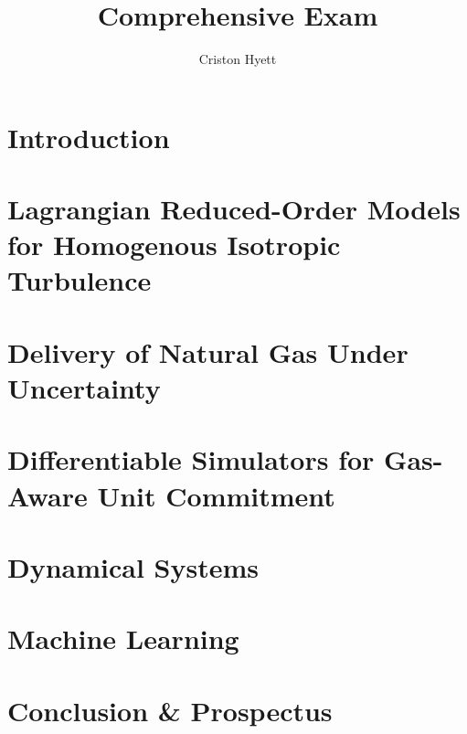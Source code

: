\documentclass{article}
\title{Comprehensive Exam}
\author{Criston Hyett}
\newcommand{\<}{\langle}
\renewcommand{\>}{\rangle}
\begin{document}
\twocolumn

\maketitle

\section{Introduction}


\section{Lagrangian Reduced-Order Models for Homogenous Isotropic Turbulence}
\graphicspath{{./LDM/figs/}}


\section{Delivery of Natural Gas Under Uncertainty}
\graphicspath{{./FluxControlLinepack/}}


\section{Differentiable Simulators for Gas-Aware Unit Commitment}


\section{Dynamical Systems}

\section{Machine Learning}

\section{Conclusion \& Prospectus}
\end{document}
